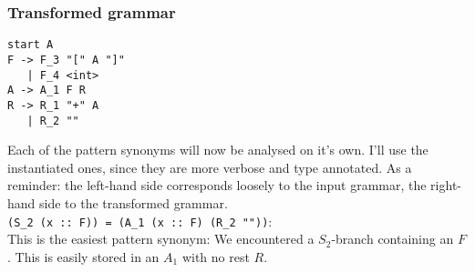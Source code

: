 \documentclass[a4paper]{article}
\begin{document}
\subsubsection*{Transformed grammar}
\begin{lstlisting}[language=grammar]
start A
F -> F_3 "[" A "]"
   | F_4 <int>
A -> A_1 F R
R -> R_1 "+" A
   | R_2 ""
\end{lstlisting}

Each of the pattern synonyms will now be analysed on it's own. I'll use the instantiated ones, since they are more verbose and type annotated.
As a reminder: the left-hand side corresponds loosely to the input grammar, the right-hand side to the transformed grammar.\\
\verb|(S_2 (x :: F)) = (A_1 (x :: F) (R_2 ""))|:\\
This is the easiest pattern synonym: We encountered a $S_2$-branch containing an $F$. This is easily stored in an $A_1$ with no rest $R$.\\
\end{document}
